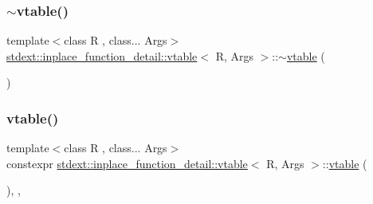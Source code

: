\mbox{\label{structstdext_1_1inplace__function__detail_1_1vtable_a9358b57ba7aa53ea5209476490644148}} 
\subsubsection{\texorpdfstring{$\sim$vtable()}{~vtable()}\hspace{0.1cm}{\footnotesize\ttfamily [1/2]}}
{\footnotesize\ttfamily template$<$class R , class... Args$>$ \\
\hyperlink{structstdext_1_1inplace__function__detail_1_1vtable}{stdext\+::inplace\+\_\+function\+\_\+detail\+::vtable}$<$ R, Args $>$\+::$\sim$\hyperlink{structstdext_1_1inplace__function__detail_1_1vtable}{vtable} (\begin{DoxyParamCaption}{ }\end{DoxyParamCaption})\hspace{0.3cm}{\ttfamily [default]}}

\mbox{\label{structstdext_1_1inplace__function__detail_1_1vtable_acec966ae149e457bf0f5042974254ba4}} 
\subsubsection{\texorpdfstring{vtable()}{vtable()}\hspace{0.1cm}{\footnotesize\ttfamily [5/8]}}
{\footnotesize\ttfamily template$<$class R , class... Args$>$ \\
constexpr \hyperlink{structstdext_1_1inplace__function__detail_1_1vtable}{stdext\+::inplace\+\_\+function\+\_\+detail\+::vtable}$<$ R, Args $>$\+::\hyperlink{structstdext_1_1inplace__function__detail_1_1vtable}{vtable} (\begin{DoxyParamCaption}{ }\end{DoxyParamCaption})\hspace{0.3cm}{\ttfamily [inline]}, {\ttfamily [explicit]}, {\ttfamily [noexcept]}}

